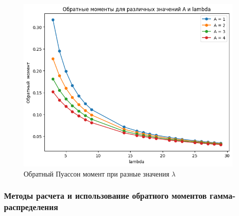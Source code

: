 \documentclass[13pt]{article}
\begin{document}


\vspace{10 mm}
\begin{figure}[htp]
    \centering
    \includegraphics[width=14 cm]{images/poisson2.png}
    \caption{ Обратный Пуассон момент при разные значения $\lambda$ }
    \label{poisson_fig}
\end{figure}
\vspace{10 mm}

\subsubsection{Методы расчета и использование обратного моментов гамма-распределения }
\end{document}
